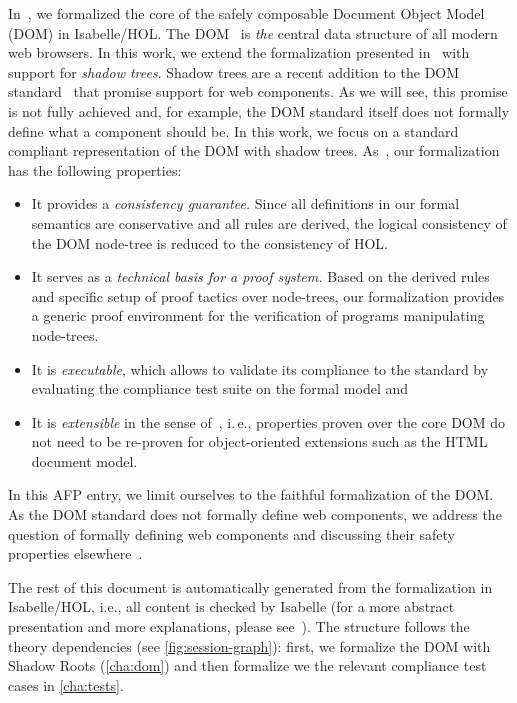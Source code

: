 \documentclass[10pt,DIV16,a4paper,abstract=true,twoside=semi,openright]
{scrreprt}
\newcommand{\ie}{i.\,e.\xspace}
\begin{document}
In~\cite{brucker.ea:afp-core-sc-dom:2020}, we formalized the core of
the safely composable Document Object Model (DOM) in
Isabelle/HOL\@. The DOM~\cite{whatwg:dom:2017,w3c:dom:2015} is
\emph{the} central data structure of all modern web browsers. In this
work, we extend the formalization presented
in~\cite{brucker.ea:afp-core-dom:2018} with support for \emph{shadow
  trees}. Shadow trees are a recent addition to the DOM
standard~\cite{whatwg:dom:2017} that promise support for web
components. As we will see, this promise is not fully achieved and,
for example, the DOM standard itself does not formally define what a
component should be. In this work, we focus on a standard compliant
representation of the DOM with shadow
trees. As~\cite{brucker.ea:afp-core-sc-dom:2020}, our formalization has
the following properties:
\begin{itemize}
\item It provides a \emph{consistency guarantee.} Since all
  definitions in our formal semantics are conservative and all rules
  are derived, the logical consistency of the DOM node-tree is reduced
  to the consistency of HOL.
\item It serves as a \emph{technical basis for a proof system.}  Based
  on the derived rules and specific setup of proof tactics over
  node-trees, our formalization provides a generic proof environment
  for the verification of programs manipulating node-trees.
\item It is \emph{executable}, which allows to validate its compliance
  to the standard by evaluating the compliance test suite on the
  formal model and
\item It is \emph{extensible} in the sense
  of~\cite{brucker.ea:extensible:2008-b,brucker:interactive:2007},
  \ie, properties proven over the core DOM do not need to be re-proven
  for object-oriented extensions such as the HTML document model.
\end{itemize}

In this AFP entry, we limit ourselves to the faithful formalization of
the DOM. As the DOM standard does not formally define web components,
we address the question of formally defining web components and
discussing their safety properties
elsewhere~\cite{brucker.ea:afp-sc-dom-components:2020,brucker.ea:web-components:2019}.

The rest of this document is automatically generated from the formalization 
in Isabelle/HOL, i.e., all content is checked by Isabelle (for a more 
abstract presentation and more explanations, please 
see~\cite{herzberg:web-components:2020}). The structure follows the theory 
dependencies (see \autoref{fig:session-graph}): first, we formalize the DOM 
with Shadow Roots (\autoref{cha:dom}) and then formalize we the relevant
compliance test cases in \autoref{cha:tests}. 
\end{document}
